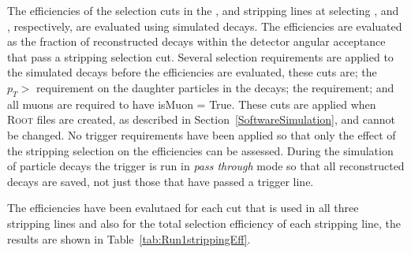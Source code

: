The efficiencies of the selection cuts in the \bmumu, \bhh and \bujpsik stripping lines at selecting \bmumu, \bhh and \bujpsik, respectively, are evaluated using simulated decays. 
The efficiencies are evaluated as the fraction of reconstructed decays within the detector angular acceptance that pass a stripping selection cut.
Several selection requirements are applied to the simulated decays before the efficiencies are evaluated, these cuts are; the $p_T>$ requirement on the daughter particles in the decays; the \chitrk requirement; and all muons are required to have isMuon = True. These cuts are applied when \textsc{Root} files are created, as described in Section~\ref{SoftwareSimulation}, and cannot be changed.
No trigger requirements have been applied so that only the effect of the stripping selection on the efficiencies can be assessed. During the simulation of particle decays the trigger is run in {\it pass through} mode so that all reconstructed decays are saved, not just those that have passed a trigger line.


The efficiencies have been evalutaed for each cut that is used in all three stripping lines and also for the total selection efficiency of each stripping line, the results are shown in Table~\ref{tab:Run1strippingEff}.

